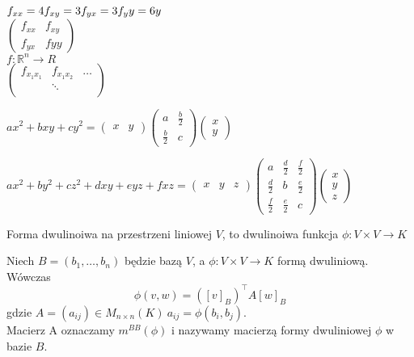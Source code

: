 $ f_{xx} = 4 \\ f_{xy} = 3 \\ f_{yx} = 3 \\ f_yy = 6y$ \\
$\begin{pmatrix} 
    f_{xx} & f_{xy} \\ f_{yx} & f{yy} 
\end{pmatrix}$ \\ 
$f: \mathbb R^n \to R$\\ 
$\begin{pmatrix} 
    f_{x_1 x_1} & f_{x_1 x_2} & \ldots \\ 
        & \ddots & \\ 
        & & 
\end{pmatrix}$ 
\begin{prz} 
    $a x^2 + b xy + cy^2 = \begin{pmatrix} x & y \end{pmatrix}
    \begin{pmatrix} a & \frac{b}{2} \\ \frac{b}{2} & c \end{pmatrix} 
    \begin{pmatrix} x \\ y \end{pmatrix}$
\end{prz} 
\begin{prz} 
    $a x^2 + by^2 + cz^2 + dxy + eyz + fxz = 
    \begin{pmatrix} x & y & z \end{pmatrix} 
    \begin{pmatrix} a & \frac{d}{2} & \frac{f}{2} \\ 
                    \frac{d}{2} & b & \frac{e}{2} \\ 
                \frac{f}{2} & \frac{e}{2} & c \end{pmatrix} 
    \begin{pmatrix} x \\ y \\ z \end{pmatrix} $
\end{prz} 
\begin{df} 
    Forma dwulinoiwa na przestrzeni liniowej $V$, to dwulinoiwa funkcja $\phi: V \times 
    V \to K$
\end{df}
\begin{ft} 
    Niech $B = (b_1,\ldots,b_n)$ będzie bazą $V$, a $\phi: V \times V \to K$ formą
    dwuliniową. Wówczas \[ \phi(v,w) = ([v]_B)^\top A [w]_B\] gdzie $A = (a_{ij}) 
    \in M_{n \times n} (K) \ a_{ij} = \phi(b_i,b_j)$. \\ 
    Macierz A oznaczamy $m^{BB}(\phi)$ i nazywamy macierzą formy dwuliniowej $\phi$ 
    w bazie $B$.
\end{ft} 
